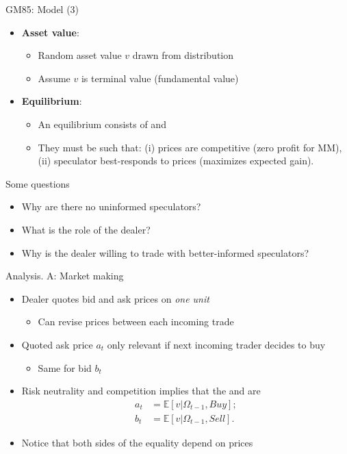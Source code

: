\documentclass[english,10pt]{beamer}
\begin{document}
\begin{frame}{GM85: Model (3)}
\begin{itemize}
	\item \textbf{Asset value}:
	\begin{itemize}
		\item Random asset value $v$ drawn from distribution
		\item Assume $v$ is terminal value (fundamental value)
	\end{itemize}
	\item \textbf{Equilibrium}:
	\begin{itemize}
		\item An equilibrium consists of  and 
		\item They must be such that: (i) prices are competitive (zero profit for MM), (ii) speculator best-responds to prices (maximizes expected gain).
	\end{itemize}
\end{itemize}
\end{frame}


\begin{frame}{Some questions}
\begin{itemize}
	\item Why are there no uninformed speculators?
	\item What is the role of the dealer?
	\item Why is the dealer willing to trade with better-informed speculators?
\end{itemize}
\end{frame}


\begin{frame}{Analysis. A: Market making}
\begin{itemize}
	\item Dealer quotes bid and ask prices on \textit{one unit}
	\begin{itemize}
		\item Can revise prices between each incoming trade
	\end{itemize}
	\item Quoted ask price $a_t$ only relevant if next incoming trader decides to buy
	\begin{itemize}
		\item Same for bid $b_t$
	\end{itemize}
	\item Risk neutrality and competition implies that the  and  are
	\begin{align*}
		a_t & = \mathbb{E}[v|\Omega_{t-1}, Buy]; \\
		b_t &= \mathbb{E}[v|\Omega_{t-1},  Sell].
	\end{align*}
	\item Notice that both sides of the equality depend on prices
\end{itemize}
\end{frame}
\end{document}
